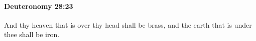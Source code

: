 
		\paragraph{Deuteronomy 28:23} %
			\label{DEUTERONOMY-28-23}

			And thy heaven that is over thy head shall be brass, and the earth that is under thee shall be iron.


